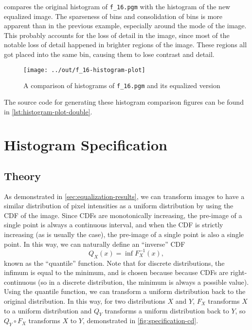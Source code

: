\documentclass[headings=optiontoheadandtoc,listof=totoc,parskip=full]{scrartcl}
\begin{document}
 compares the original histogram of \texttt{f\_16.pgm} with the histogram of the new equalized image. The sparseness of bins and consolidation of bins is more apparent than in the previous example, especially around the mode of the image. This probably accounts for the loss of detail in the image, since most of the notable loss of detail happened in brighter regions of the image. These regions all got placed into the same bin, causing them to lose contrast and detail.

\begin{figure}[H]
	\centering\texttt{[image: ../out/f\_16-histogram-plot]}
	\caption{A comparison of histograms of \texttt{f\_16.pgm} and its equalized version}
	\label{fig:equal-histogram-2}
\end{figure}

The source code for generating these histogram comparison figures can be found in \cref{lst:histogram-plot-double}.

\section{Histogram Specification}

\subsection{Theory}
As demonstrated in \cref{sec:equalization-results}, we can transform images to have a similar distribution of pixel intensities as a uniform distribution by using the CDF of the image. Since CDFs are monotonically increasing, the pre-image of a single point is always a continuous interval, and when the CDF is strictly increasing (as is usually the case), the pre-image of a single point is also a single point. In this way, we can naturally define an ``inverse'' CDF
\begin{equation}
	Q_X(x) = \inf F_X^{-1}({x}), \label{eq:quantile-func}
\end{equation}
known as the ``quantile'' function. Note that for discrete distributions, the infimum is equal to the minimum, and is chosen because because CDFs are right-continuous (so in a discrete distribution, the minimum is always a possible value). Using the quantile function, we can transform a uniform distribution back to the original distribution. In this way, for two distributions $X$ and $Y$, $F_X$ transforms $X$ to a uniform distribution and $Q_Y$ transforms a uniform distribution back to $Y$, so $Q_Y \circ F_X$ transforms $X$ to $Y$, demonstrated in  \cref{fig:specification-cd}.
\end{document}
